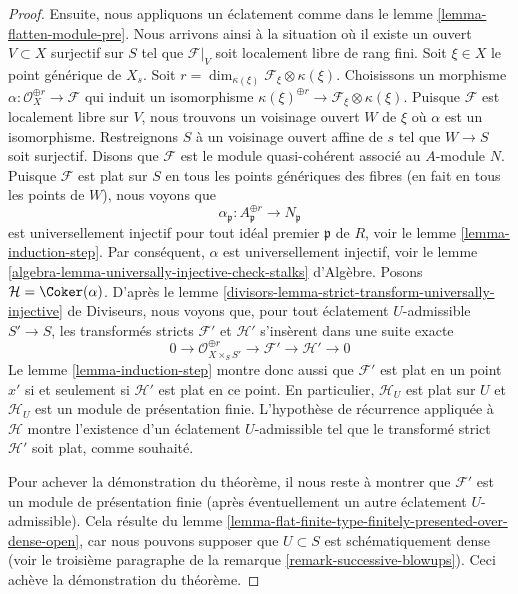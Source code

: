 \begin{proof}
\medskip\noindent
Ensuite, nous appliquons un éclatement comme dans le lemme \ref{lemma-flatten-module-pre}.
Nous arrivons ainsi à la situation où il existe un
ouvert $V \subset X$ surjectif sur $S$ tel que $\mathcal{F}|_V$
soit localement libre de rang fini. Soit $\xi \in X$ le point générique de $X_s$. Soit
$r = \dim_{\kappa(\xi)} \mathcal{F}_\xi \otimes \kappa(\xi)$.
Choisissons un morphisme $\alpha : \mathcal{O}_X^{\oplus r} \to \mathcal{F}$
qui induit un isomorphisme
$\kappa(\xi)^{\oplus r} \to \mathcal{F}_\xi \otimes \kappa(\xi)$.
Puisque $\mathcal{F}$ est localement libre sur $V$, nous trouvons un voisinage ouvert
$W$ de $\xi$ où $\alpha$ est un isomorphisme. Restreignons $S$ à un
voisinage ouvert affine de $s$ tel que $W \to S$ soit surjectif. Disons que $\mathcal{F}$
est le module quasi-cohérent associé au $A$-module $N$. Puisque
$\mathcal{F}$ est plat sur $S$ en tous les points génériques des fibres
(en fait en tous les points de $W$), nous voyons que
$$
\alpha_\mathfrak p : A_\mathfrak p^{\oplus r} \to N_\mathfrak p
$$
est universellement injectif pour tout idéal premier $\mathfrak p$ de $R$, voir le
lemme \ref{lemma-induction-step}. Par conséquent, $\alpha$ est universellement injectif,
voir le lemme \ref{algebra-lemma-universally-injective-check-stalks} d'Algèbre.
Posons $\mathcal{H} = \Coker(\alpha)$.
D'après le lemme \ref{divisors-lemma-strict-transform-universally-injective} de Diviseurs,
nous voyons que, pour tout éclatement $U$-admissible $S' \to S$,
les transformés stricts $\mathcal{F}'$ et $\mathcal{H}'$
s'insèrent dans une suite exacte
$$
0 \to \mathcal{O}_{X \times_S S'}^{\oplus r} \to \mathcal{F}'
\to \mathcal{H}' \to 0
$$
Le lemme \ref{lemma-induction-step} montre donc aussi que $\mathcal{F}'$
est plat en un point $x'$ si et seulement si
$\mathcal{H}'$ est plat en ce point. En particulier, $\mathcal{H}_U$ est
plat sur $U$ et $\mathcal{H}_U$ est un module de présentation finie.
L'hypothèse de récurrence appliquée à $\mathcal{H}$ montre l'existence
d'un éclatement $U$-admissible tel que le transformé strict
$\mathcal{H}'$ soit plat, comme souhaité.

\medskip\noindent
Pour achever la démonstration du théorème, il nous reste à montrer que $\mathcal{F}'$
est un module de présentation finie (après éventuellement un autre
éclatement $U$-admissible). Cela résulte du
lemme \ref{lemma-flat-finite-type-finitely-presented-over-dense-open},
car nous pouvons supposer que $U \subset S$ est schématiquement dense (voir le
troisième paragraphe de la remarque \ref{remark-successive-blowups}).
Ceci achève la démonstration du théorème.
\end{proof}





